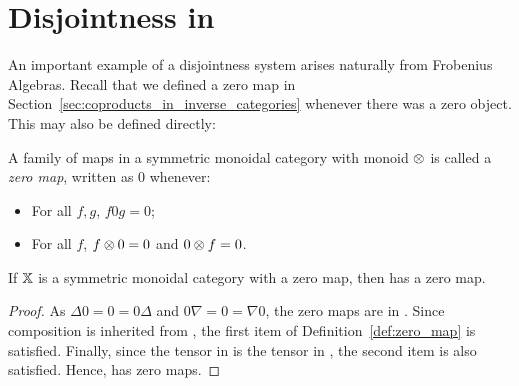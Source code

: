\section{Disjointness in \CFrob}
\label{sec:disjointness_in_frobenius_algebras}
An important example of a disjointness system arises naturally from Frobenius Algebras. Recall that
we defined a zero map in Section~\ref{sec:coproducts_in_inverse_categories} whenever there was a
zero object. This may also be defined directly:

\begin{definition}\label{def:zero_map}
  A family of maps in a symmetric monoidal category with monoid $\otimes$ is called a \emph{zero map},
  written as $0$ whenever:
  \begin{itemize}
    \item For all $f, g$, $f 0 g = 0$;
    \item For all $f$, $f \otimes 0 = 0$ and $ 0 \otimes f = 0$.
  \end{itemize}
\end{definition}

\begin{lemma}\label{lem:cfrobx-has-a-zero-when-x-has-zero}
  If $\mathbb{X}$ is a symmetric monoidal category with a zero map, then \CFrob has a zero map.
\end{lemma}
\begin{proof}
  As $\Delta 0 = 0 = 0 \Delta$ and $0 \nabla = 0 = \nabla 0$, the zero maps are in \CFrob. Since
  composition is inherited from \X, the first item of Definition~\ref{def:zero_map} is
  satisfied. Finally, since the tensor in \X is the tensor in \CFrob, the second item is also
  satisfied. Hence, \CFrob has zero maps.
\end{proof}

